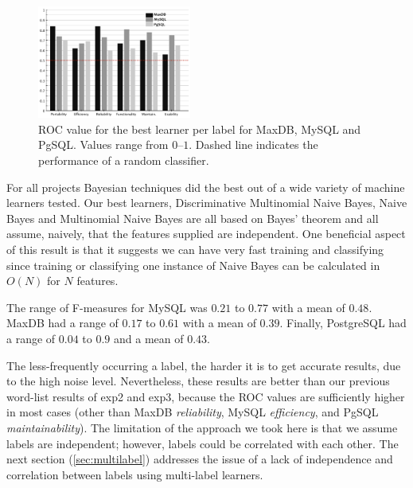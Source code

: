\documentclass[smallextended]{svjour3}       %
\begin{document}

\begin{figure}[t]
\centering
\includegraphics[width=0.45\textwidth]{figures/both-supervised}
\caption[]{ROC value for the best learner per label for MaxDB, MySQL and PgSQL. Values range from $0$--$1$.  Dashed line indicates the performance of a random
classifier.
}
\label{fig:best-learn-per-tag}
\end{figure}

For all projects Bayesian techniques did the best out of a wide variety of machine learners tested. 
Our best learners, Discriminative Multinomial Naive Bayes, Naive Bayes
and Multinomial Naive Bayes  are all based on Bayes' theorem and all
assume, naively, that the features supplied are independent. 
One beneficial aspect of this result is that it suggests we can have
very fast training and classifying  since training or classifying one
instance of Naive Bayes can be calculated in $O(N)$
for $N$ features.


The range of F-measures for MySQL was $0.21$ to $0.77$ with a mean
of $0.48$. MaxDB had a range of $0.17$ to $0.61$ with a mean
of $0.39$. Finally, PostgreSQL had a range of $0.04$ to $0.9$ and a mean of $0.43$.


The less-frequently occurring a label, the harder it is to get accurate
results, due to the high noise level. Nevertheless, these results are
better than our previous word-list results of \textsf{exp2} and
\textsf{exp3}, because the ROC values are sufficiently higher in most
cases (other than MaxDB \emph{reliability}, MySQL \emph{efficiency}, and PgSQL \emph{maintainability}). The
limitation of the approach we took here is that we assume labels are
independent; however, labels could be correlated with each other. 
The next section (\ref{sec:multilabel})
addresses the issue of a lack of independence and correlation between
labels
using multi-label learners.
\end{document}
